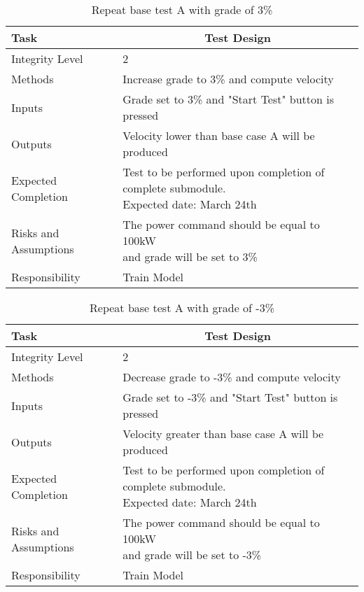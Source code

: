 \documentclass[]{article}
\begin{document}
	\begin{table}[H]
		\centering
		\caption{Repeat base test A with grade of 3\%}
		\begin{tabular}{|l|l|}
			\hline
			Task & \multicolumn{1}{c|}{Test Design} \\ \hline
			Integrity Level & 2 \\ \hline
			Methods & Increase grade to 3\% and compute velocity  \\ \hline
			Inputs &  Grade set to 3\% and "Start Test" button is pressed \\ \hline
			Outputs &  Velocity lower than base case A will be produced  \\ \hline
			Expected Completion & \parbox[t]{10cm}{Test to be performed upon completion of complete submodule.\\ Expected date: March 24th}\\ \hline
			Risks and Assumptions & \parbox[t]{10cm}{The power command should be equal to 100kW \\and grade will be set to 3\% }\\ \hline
			Responsibility & Train Model\\ \hline
		\end{tabular}
	\end{table}

	\begin{table}[H]
		\centering
		\caption{Repeat base test A with grade of -3\%}
		\begin{tabular}{|l|l|}
			\hline
			Task & \multicolumn{1}{c|}{Test Design} \\ \hline
			Integrity Level & 2 \\ \hline
			Methods & Decrease grade to -3\% and compute velocity  \\ \hline
			Inputs &  Grade set to -3\% and "Start Test" button is pressed \\ \hline
			Outputs &  Velocity greater than base case A will be produced  \\ \hline
			Expected Completion & \parbox[t]{10cm}{Test to be performed upon completion of complete submodule.\\ Expected date: March 24th}\\ \hline
			Risks and Assumptions &\parbox[t]{10cm}{ The power command should be equal to 100kW \\and grade will be set to -3\%} \\ \hline
			Responsibility & Train Model\\ \hline
		\end{tabular}
	\end{table}
   
\end{document}
